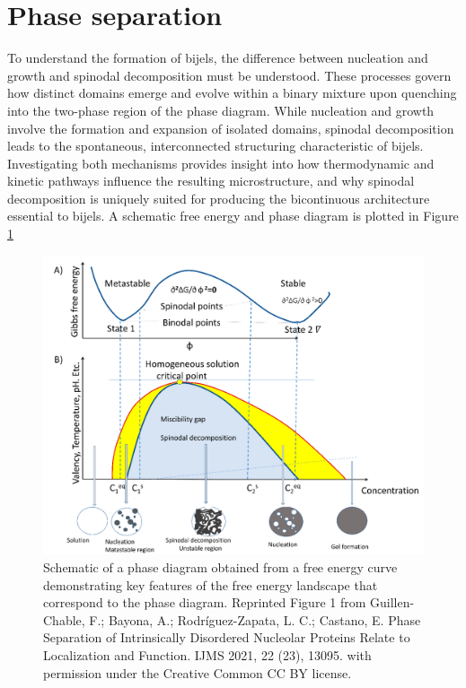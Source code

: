\section{Phase separation}

To understand the formation of bijels, the difference between nucleation and growth and spinodal decomposition must be understood. These processes 
govern how distinct domains emerge and evolve within a binary mixture upon quenching into the two-phase region of the phase diagram. While nucleation and growth involve the formation 
and expansion of isolated domains, spinodal decomposition leads to the spontaneous, interconnected structuring characteristic of bijels. Investigating both mechanisms provides insight 
into how thermodynamic and kinetic pathways influence the resulting microstructure, and why spinodal decomposition is uniquely suited for producing the bicontinuous 
architecture essential to bijels. A schematic free energy and phase diagram is plotted in Figure \ref{fig:phase_diagram}

\begin{figure}
    \centering
    \includegraphics[scale = 0.7]{../figures/literature_review/phase_diagram.png}
    \caption{Schematic of a phase diagram obtained from a free energy curve demonstrating key features of the free energy landscape that correspond
             to the phase diagram. Reprinted Figure 1 from
             Guillen-Chable, F.; Bayona, A.; Rodríguez-Zapata, L. C.; Castano, E. Phase Separation of Intrinsically Disordered 
             Nucleolar Proteins Relate to Localization and Function. IJMS 2021, 22 (23), 13095. with permission under the Creative Common CC BY license.}
    \label{fig:phase_diagram}
\end{figure}

